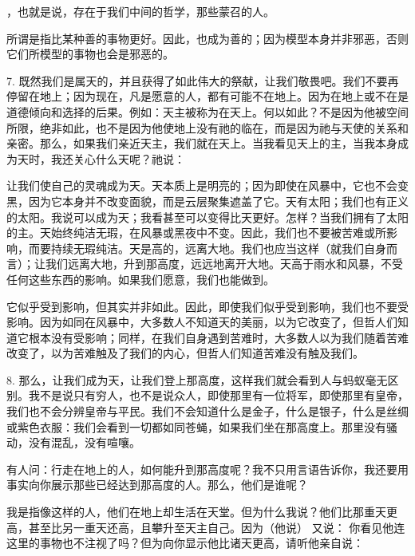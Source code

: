 ，也就是说，存在于我们中间的哲学，那些蒙召的人。\par

所谓是指比某种善的事物更好。因此，也成为善的；因为模型本身并非邪恶，否则它们所模型的事物也会是邪恶的。\par

7. 既然我们是属天的，并且获得了如此伟大的祭献，让我们敬畏吧。我们不要再停留在地上；因为现在，凡是愿意的人，都有可能不在地上。因为在地上或不在是道德倾向和选择的后果。例如：天主被称为在天上。何以如此？不是因为他被空间所限，绝非如此，也不是因为他使地上没有祂的临在，而是因为祂与天使的关系和亲密。那么，如果我们亲近天主，我们就在天上。当我看见天上的主，当我本身成为天时，我还关心什么天呢？祂说：\par

让我们使自己的灵魂成为天。天本质上是明亮的；因为即使在风暴中，它也不会变黑，因为它本身并不改变面貌，而是云层聚集遮盖了它。天有太阳；我们也有正义的太阳。我说可以成为天；我看甚至可以变得比天更好。怎样？当我们拥有了太阳的主。天始终纯洁无瑕，在风暴或黑夜中不变。因此，我们也不要被苦难或所影响，而要持续无瑕纯洁。天是高的，远离大地。我们也应当这样（就我们自身而言）；让我们远离大地，升到那高度，远远地离开大地。天高于雨水和风暴，不受任何这些东西的影响。如果我们愿意，我们也能做到。\par

它似乎受到影响，但其实并非如此。因此，即使我们似乎受到影响，我们也不要受影响。因为如同在风暴中，大多数人不知道天的美丽，以为它改变了，但哲人们知道它根本没有受影响；同样，在我们自身遇到苦难时，大多数人以为我们随着苦难改变了，以为苦难触及了我们的内心，但哲人们知道苦难没有触及我们。\par

8. 那么，让我们成为天，让我们登上那高度，这样我们就会看到人与蚂蚁毫无区别。我不是说只有穷人，也不是说众人，即使那里有一位将军，即使那里有皇帝，我们也不会分辨皇帝与平民。我们不会知道什么是金子，什么是银子，什么是丝绸或紫色衣服：我们会看到一切都如同苍蝇，如果我们坐在那高度上。那里没有骚动，没有混乱，没有喧嚷。\par

有人问：行走在地上的人，如何能升到那高度呢？我不只用言语告诉你，我还要用事实向你展示那些已经达到那高度的人。那么，他们是谁呢？\par

我是指像这样的人，他们在地上却生活在天堂。但为什么我说？他们比那重天更高，甚至比另一重天还高，且攀升至天主自己。因为（他说） 又说： 你看见他连这里的事物也不注视了吗？但为向你显示他比诸天更高，请听他亲自说：\par


